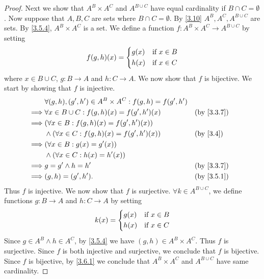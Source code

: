 \begin{proof}
	Next we show that \(A^B \times A^C\) and \(A^{B \cup C}\) have equal cardinality if \(B \cap C = \emptyset\).
	Now suppose that \(A, B, C\) are sets where \(B \cap C = \emptyset\).
	By \cref{3.10} \(A^B, A^C, A^{B \cup C}\) are sets.
	By \cref{3.5.4}, \(A^B \times A^C\) is a set.
	We define a function \(f : A^B \times A^C \to A^{B \cup C}\) by setting
	\[
		f(g, h)(x) = \begin{dcases}
			g(x) & \text{if } x \in B \\
			h(x) & \text{if } x \in C
		\end{dcases}
	\]
	where \(x \in B \cup C\), \(g : B \to A\) and \(h : C \to A\).
	We now show that \(f\) is bijective.
	We start by showing that \(f\) is injective.
	\begin{align*}
		         & \forall (g, h), (g', h') \in A^B \times A^C : f(g, h) = f(g', h')                 \\
		\implies & \forall x \in B \cup C : f(g, h)(x) = f(g', h')(x)                &  & \by{3.3.7} \\
		\implies & (\forall x \in B : f(g, h)(x) = f(g', h')(x))                                     \\
		         & \land (\forall x \in C : f(g, h)(x) = f(g', h')(x))               &  & \by{3.4}   \\
		\implies & (\forall x \in B : g(x) = g'(x))                                                  \\
		         & \land (\forall x \in C : h(x) = h'(x))                                            \\
		\implies & g = g' \land h = h'                                               &  & \by{3.3.7} \\
		\implies & (g, h) = (g', h').                                                &  & \by{3.5.1}
	\end{align*}
	Thus \(f\) is injective.
	We now show that \(f\) is surjective.
	\(\forall k \in A^{B \cup C}\), we define functions \(g : B \to A\) and \(h : C \to A\) by setting
	\[
		k(x) = \begin{dcases}
			g(x) & \text{if } x \in B \\
			h(x) & \text{if } x \in C
		\end{dcases}
	\]
	Since \(g \in A^B \land h \in A^C\), by \cref{3.5.4} we have \((g, h) \in A^B \times A^C\).
	Thus \(f\) is surjective.
	Since \(f\) is both injective and surjective, we conclude that \(f\) is bijective.
	Since \(f\) is bijective, by \cref{3.6.1} we conclude that \(A^B \times A^C\) and \(A^{B \cup C}\) have same cardinality.


\end{proof}
